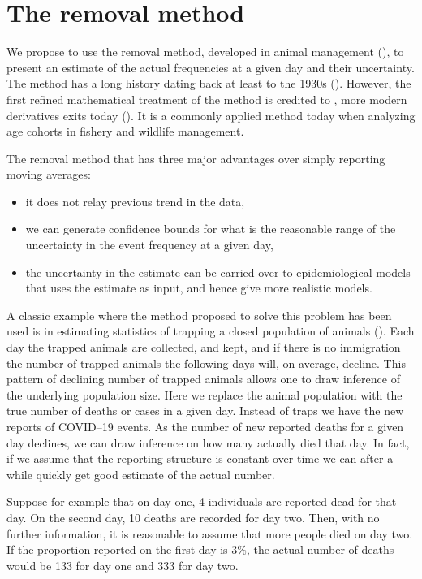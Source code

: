 \documentclass[a4paper,11pt,article,oneside,openany,american]{memoir}
\begin{document}
\chapter{The removal method}
We propose to use the removal method, developed in animal management (\cite{Pollock1991_review_papers}), to present an estimate of the actual frequencies at a given day and their uncertainty. The method has a long history dating back at least to the 1930s (\cite{Leslie1939_attempt_determine}). However, the first refined mathematical treatment of the method is credited to \cite{Moran1951_mathematical_theory}, more modern derivatives exits today (\cite{Matechou2016_open_models}). It is a commonly applied method today when analyzing age cohorts in fishery and wildlife management.

The removal method that has three major advantages over simply reporting moving averages:
\begin{itemize}
	\item it does not relay previous trend in the data,
	\item we can generate confidence bounds for what is the reasonable range of the uncertainty in the event frequency at a given day,
	\item the uncertainty in the estimate can be carried over to epidemiological models that uses the estimate as input, and hence give more realistic models.
\end{itemize}

A classic example where the method proposed to solve this problem has been used is in estimating statistics of trapping a closed population of animals (\cite{Pollock1991_review_papers}). Each day the trapped animals are collected, and kept, and if there is no immigration the number of trapped animals the following days will, on average, decline. This pattern of declining number of trapped animals allows one to draw inference of the underlying population size. Here we replace the animal population with the true number of deaths or cases in a given day. Instead of traps we have the new reports of COVID--19 events. As the number of new reported deaths for a given day declines, we can draw inference on how many actually died that day. In fact, if we assume that the reporting structure is constant over time we can after a while quickly get good estimate of the actual number.

Suppose for example that on day one, 4 individuals are reported dead for that day. On the second day, 10 deaths are recorded for day two. Then, with no further information, it is reasonable to assume that more people died on day two. If the proportion reported on the first day is 3\%, the actual number of deaths would be 133 for day one and 333 for day two.
\end{document}
